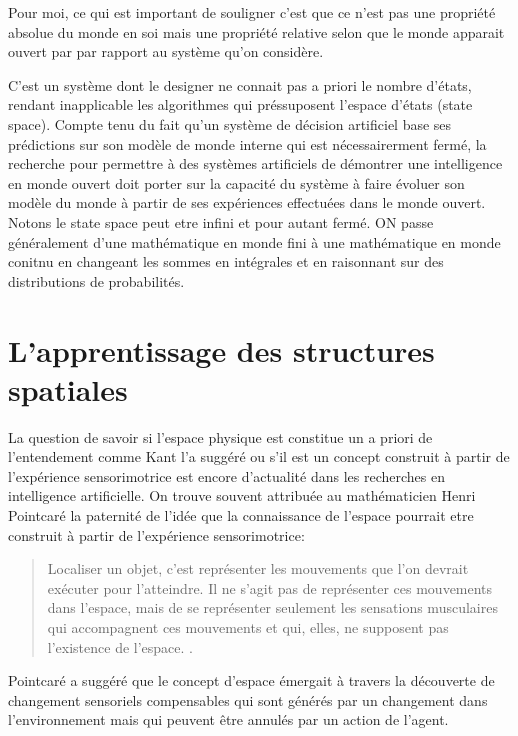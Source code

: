 Pour moi, ce qui est important de souligner c'est que ce n'est pas une propriété absolue du monde en soi mais une propriété relative selon que le monde apparait ouvert par par rapport au système qu'on considère. 

C'est un système dont le designer ne connait pas a priori le nombre d'états, rendant inapplicable les algorithmes qui préssuposent l'espace d'états (state space). 
Compte tenu du fait qu'un système de décision artificiel base ses prédictions sur son modèle de monde interne qui est nécessairerment fermé, la recherche pour permettre à des systèmes artificiels de démontrer une intelligence en monde ouvert doit porter sur la capacité du système à faire évoluer son modèle du monde à partir de ses expériences effectuées dans le monde ouvert. 
Notons le state space peut etre infini et pour autant fermé. 
ON passe généralement d'une mathématique en monde fini à une mathématique en monde conitnu en changeant les sommes en intégrales et en raisonnant sur des distributions de probabilités. 




\section{L'apprentissage des structures spatiales}

\noindent
La question de savoir si l'espace physique est constitue un \og a priori de l'entendement \fg comme Kant l'a suggéré ou s'il est un concept construit à partir de l'expérience sensorimotrice est encore d'actualité dans les recherches en intelligence artificielle. 
On trouve souvent attribuée au mathématicien Henri Pointcaré la paternité de l'idée que la connaissance de l'espace pourrait etre construit à partir de l'expérience sensorimotrice: 

\begin{quote}
\og Localiser un objet, c'est représenter les mouvements que l'on devrait exécuter pour l'atteindre. 
Il ne s’agit pas de représenter ces mouvements dans l’espace, mais de se représenter seulement les sensations musculaires qui accompagnent ces mouvements et qui, elles, ne supposent pas l’existence de l’espace. \fg \cite[p.~67]{pointcare_science_1902}.
\end{quote}

Pointcaré a suggéré que le concept d'espace émergait à travers la découverte de changement sensoriels compensables qui sont générés par un changement dans l'environnement mais qui peuvent être annulés par un action de l'agent. 

